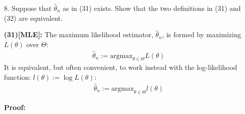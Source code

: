 \documentclass[10pt]{article}
\begin{document}



8. Suppose that $\hat{\theta}_n $ as in (31) exists. Show that the two definitions in (31) and (32) are equivalent. 

\textbf{(31)[MLE]:} The maximum likelihood estimator, $\hat{\theta}_n $, is formed by maximizing $L(\theta)$ over $\Theta $:
\begin{gather*}
    \hat{\theta}_n := \text{argmax}_{\theta \in \Theta}L(\theta)
\end{gather*}
It is equivalent, but often convenient, to work instead with the log-likelihood function: $l(\theta) := \log L(\theta)$:
\begin{gather*}
    \hat{\theta}_n := \text{argmax}_{\theta \in \Theta}l(\theta)
\end{gather*}

\textbf{Proof:}
\end{document}
